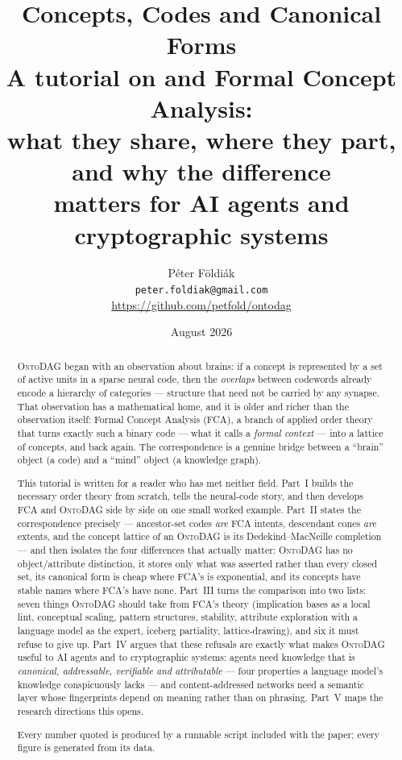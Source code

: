 \documentclass[11pt,a4paper]{article}
\title{\vspace{-1.2cm}\textbf{Concepts, Codes and Canonical Forms}\\[2mm]
  \large A tutorial on \odag{} and Formal Concept Analysis:\\
  what they share, where they part, and why the difference\\
  matters for AI agents and cryptographic systems}
\author{P\'eter F\"oldi\'ak\\
  \small\texttt{peter.foldiak@gmail.com}\\
  \small\url{https://github.com/petfold/ontodag}}
\date{August 2026}
\theoremstyle{definition}
\theoremstyle{plain}
\theoremstyle{remark}
\newcommand{\odag}{\textsc{OntoDAG}}
\newcommand{\fca}{\textsc{FCA}}
\begin{document}
\maketitle

\begin{abstract}
\noindent
\odag{} began with an observation about brains: if a concept is represented by
a set of active units in a sparse neural code, then the \emph{overlaps} between
codewords already encode a hierarchy of categories --- structure that need not
be carried by any synapse. That observation has a mathematical home, and it is
older and richer than the observation itself: Formal Concept Analysis (\fca{}),
a branch of applied order theory that turns exactly such a binary code --- what
it calls a \emph{formal context} --- into a lattice of concepts, and back
again. The correspondence is a genuine bridge between a ``brain'' object
(a code) and a ``mind'' object (a knowledge graph).

This tutorial is written for a reader who has met neither field. Part~I builds
the necessary order theory from scratch, tells the neural-code story, and then
develops \fca{} and \odag{} side by side on one small worked example. Part~II
states the correspondence precisely --- ancestor-set codes \emph{are} \fca{}
intents, descendant cones \emph{are} extents, and the concept lattice of an
\odag{} is its Dedekind--MacNeille completion --- and then isolates the four
differences that actually matter: \odag{} has no object/attribute distinction,
it stores only what was asserted rather than every closed set, its canonical
form is cheap where \fca{}'s is exponential, and its concepts have stable
names where \fca{}'s have none. Part~III turns the comparison into two lists:
seven things \odag{} should take from \fca{}'s theory (implication bases as a
local lint, conceptual scaling, pattern structures, stability, attribute
exploration with a language model as the expert, iceberg partiality,
lattice-drawing), and six it must refuse to give up. Part~IV argues that these
refusals are exactly what makes \odag{} useful to AI agents and to
cryptographic systems: agents need knowledge that is \emph{canonical,
addressable, verifiable and attributable} --- four properties a language
model's knowledge conspicuously lacks --- and content-addressed networks need
a semantic layer whose fingerprints depend on meaning rather than on phrasing.
Part~V maps the research directions this opens.

Every number quoted is produced by a runnable script included with the
paper; every figure is generated from its data.
\end{abstract}
\end{document}
